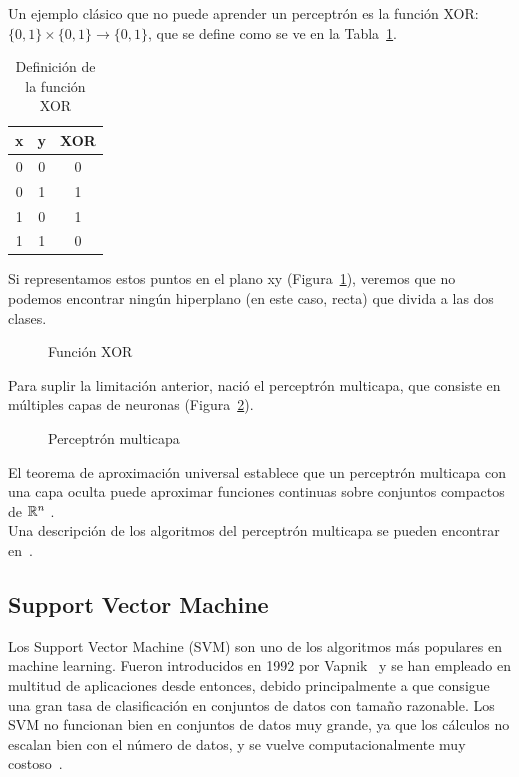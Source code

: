 Un ejemplo clásico que no puede aprender un perceptrón es la función XOR: $\{0,1\} \times \{0,1\} \to \{0,1\}$, que se define como se ve en la Tabla~\ref{tbl:xor}.\\


\begin{table}[htbp!]
	\centering
	\caption{Definición de la función XOR}
	\label{tbl:xor}
	\begin{tabular}{@{}ccc@{}}
		\toprule
		x & y & XOR \\ \midrule
		0 & 0 & 0   \\
		0 & 1 & 1   \\
		1 & 0 & 1   \\
		1 & 1 & 0   \\ \bottomrule
	\end{tabular}
\end{table}

Si representamos estos puntos en el plano xy (Figura~\ref{fig:xor}), veremos que no podemos encontrar ningún hiperplano (en este caso, recta) que divida a las dos clases.\\

\begin{figure}[htbp!]
	\centering
	\xor
	\caption{Función XOR}
	\label{fig:xor}
\end{figure}

Para suplir la limitación anterior, nació el perceptrón multicapa, que consiste en múltiples capas de neuronas (Figura~\ref{fig:perceptron_multicapa}).

\begin{figure}[htbp!]
	\centering
	\perceptronmulticapa
	\caption{Perceptrón multicapa}
	\label{fig:perceptron_multicapa}
\end{figure}

El teorema de aproximación universal establece que un perceptrón multicapa con una capa oculta puede aproximar funciones continuas sobre conjuntos compactos de $\mathbb{R}^n$ \cite{Cybenko1989}.\\

Una descripción de los algoritmos del perceptrón multicapa se pueden encontrar en~\cite{Bishop:2006:PRM:1162264,Marsland:2009:MLA:1571643, Murphy:2012:MLP:2380985}.

\subsection{Support Vector Machine}
Los Support Vector Machine (SVM) son uno de los algoritmos más populares en machine learning. Fueron introducidos en 1992 por Vapnik~\cite{Cortes:1995:SN:218919.218929} y se han empleado en multitud de aplicaciones desde entonces, debido principalmente a que consigue una gran tasa de clasificación en conjuntos de datos con tamaño razonable. Los SVM no funcionan bien en conjuntos de datos muy grande, ya que los cálculos no escalan bien con el número de datos, y se vuelve computacionalmente muy costoso~\cite[pág 119]{Marsland:2009:MLA:1571643}.\\

